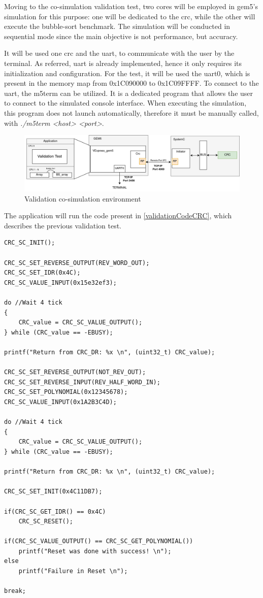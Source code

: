 Moving to the co-simulation validation test, two cores will be employed in gem5's simulation for this purpose: one will be dedicated to the 
\gls{crc}, while the other will execute the bubble-sort benchmark. The simulation will be conducted in sequential mode since 
the main objective is not performance, but accuracy.

It will be used one \gls{crc} and the \gls{uart}, to communicate with the user by the terminal.
As referred, \gls{uart} is already implemented, hence it only requires its initialization and configuration. For the test, it will be used the 
\gls{uart}0, which is present in the memory map from 0x1C090000 to 0x1C09FFFF.
To connect to the \gls{uart}, the m5term can be utilized. It is
a dedicated program that allows the user to connect to the simulated console interface. When executing the simulation, this program does not
launch automatically, therefore it must be manually called, with \textit{./m5term <host> <port>}.

\begin{figure}[H]
	\centering
 	\includegraphics[width=1\linewidth]{Images/CoSimDesign_Validation.png} 
 	\caption{Validation co-simulation environment}
	\label{fig_CoSimDesign_Validation}
\end{figure}

The application will run the code present in \ref{validationCodeCRC}, which describes the previous validation test. 

\begin{lstlisting}[style=customC, caption={CRC validation code}, label=validationCodeCRC]
CRC_SC_INIT();

CRC_SC_SET_REVERSE_OUTPUT(REV_WORD_OUT);
CRC_SC_SET_IDR(0x4C);
CRC_SC_VALUE_INPUT(0x15e32ef3);       

do //Wait 4 tick
{
	CRC_value = CRC_SC_VALUE_OUTPUT();
} while (CRC_value == -EBUSY);

printf("Return from CRC_DR: %x \n", (uint32_t) CRC_value);

CRC_SC_SET_REVERSE_OUTPUT(NOT_REV_OUT);
CRC_SC_SET_REVERSE_INPUT(REV_HALF_WORD_IN);
CRC_SC_SET_POLYNOMIAL(0x12345678);
CRC_SC_VALUE_INPUT(0x1A2B3C4D);

do //Wait 4 tick
{
	CRC_value = CRC_SC_VALUE_OUTPUT();
} while (CRC_value == -EBUSY);

printf("Return from CRC_DR: %x \n", (uint32_t) CRC_value); 

CRC_SC_SET_INIT(0x4C11DB7);

if(CRC_SC_GET_IDR() == 0x4C)
	CRC_SC_RESET();

if(CRC_SC_VALUE_OUTPUT() == CRC_SC_GET_POLYNOMIAL())
	printf("Reset was done with success! \n");
else
	printf("Failure in Reset \n");

break;
\end{lstlisting}

